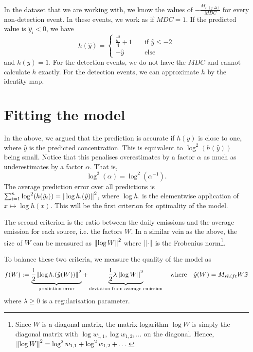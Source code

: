 \documentclass{article}
\begin{document}
In the dataset that we are working with, we know the values of $- \frac{M_{i,(j,\Delta)}}{MDC}$ for every non-detection event. In these events, we work as if $MDC = 1$. If the predicted value is $\hat{y}_i < 0$, we have 
$$
h\left(\hat{y}\right) = \begin{cases}
    \frac{\hat{y}^2}{4} + 1 &\quad\text{if } \hat{y} \le -2 \\
    -\hat{y} &\quad\text{else}
\end{cases}
$$
and $h(y) = 1$. For the detection events, we do not have the $MDC$ and cannot calculate $h$ exactly. For the detection events, we can approximate $h$ by the identity map.

\section{Fitting the model}
\label{sec: optimisation}

In the above, we argued that the prediction is accurate if $h(\hat{y})$ is close to one, where $\hat{y}$ is the predicted concentration. This is equivalent to $\log^2(h(\hat{y}))$ being small. Notice that this penalises overestimates by a factor $\alpha$ as much as underestimates by a factor $\alpha$. That is, 
$$
\log^2(\alpha) = \log^2(\alpha^{-1})
.$$
The average prediction error over all predictions is $\sum_{i=1}^n \log^2(h(\hat{y}_i)) = \norm{\log h.(\hat{y})}^2$, where $\log h.$ is the elementwise application of $x \mapsto \log h(x)$. This will be the first criterion for optimality of the model.

The second criterion is the ratio between the daily emissions and the average emission for each source, i.e. the factors $W$. In a similar vein as the above, the size of $W$ can be measured as $\norm{\log W}^2$ where $\norm{\cdot}$ is the Frobenius norm\footnote{Since $W$ is a diagonal matrix, the matrix logarithm $\log W$ is simply the diagonal matrix with $\log w_{1,1}, \log w_{1,2}, \dots$ on the diagonal. Hence, $\norm{\log W}^2 = \log^2 w_{1,1} + \log^2 w_{1,2} + \dots$}. 

To balance these two criteria, we measure the quality of the model as 
\begin{equation}
    \label{eq: cost function regularised}
f(W) := 
\underbrace{\frac{1}{2}\norm{\log h.(\hat{y}(W))}^2}_{\text{prediction error}} + \underbrace{\frac{1}{2}\lambda \norm{\log W}^2}_{\text{deviation from average emission}}
\quad\text{where}\quad 
\hat{y}(W) = M_{shift} W \tilde{x}
\end{equation}
where $\lambda \ge 0$ is a regularisation parameter.
\end{document}
